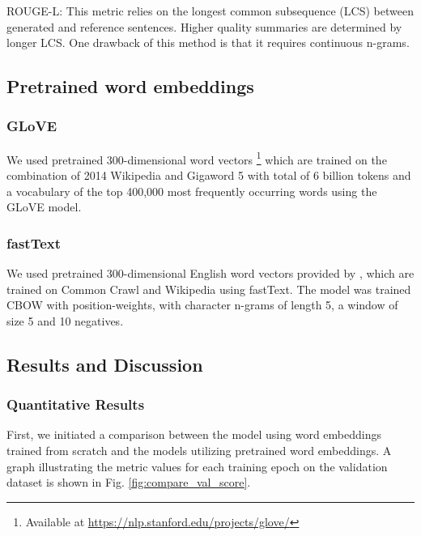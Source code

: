 \documentclass[conference]{IEEEtran}
\begin{document}
ROUGE-L: This metric relies on the longest common subsequence (LCS) between generated and reference sentences. Higher quality summaries are determined by longer LCS. One drawback of this method is that it requires continuous n-grams.

\subsection{Pretrained word embeddings}
\subsubsection{GLoVE}We used pretrained 300-dimensional word vectors \footnote{Available at \url{https://nlp.stanford.edu/projects/glove/}} which are trained on the combination of 2014 Wikipedia and Gigaword 5 with total of 6 billion tokens and a vocabulary of the top 400,000 most frequently occurring words using the GLoVE model\cite{pennington2014glove}. 
\subsubsection{fastText}We used pretrained 300-dimensional English word vectors provided by \cite{grave2018learning}, which are trained on Common Crawl and Wikipedia using fastText. The model was trained CBOW with position-weights, with character n-grams of length 5, a window of size 5 and 10 negatives. 


\subsection{Results and Discussion}
\subsubsection{Quantitative Results} \hfill %

First, we initiated a comparison between the model using word embeddings trained from scratch and the models utilizing pretrained word embeddings. A graph illustrating the metric values for each training epoch on the validation dataset is shown in Fig. \ref{fig:compare_val_score}.
\end{document}
